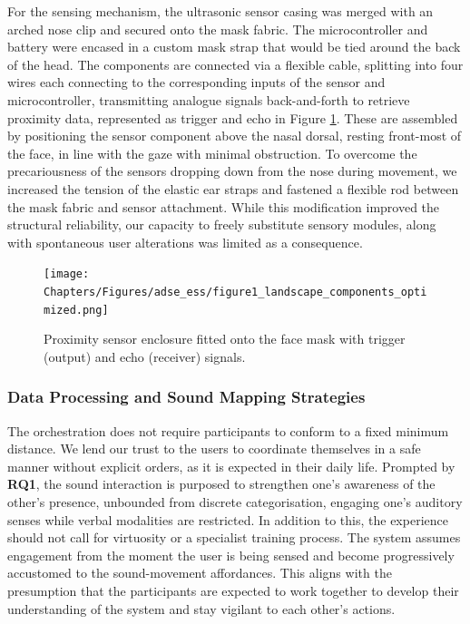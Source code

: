 For the sensing mechanism, the ultrasonic sensor casing was merged with an arched nose clip and secured onto the mask fabric. The microcontroller and battery were encased in a custom mask strap that would be tied around the back of the head. The components are connected via a flexible cable, splitting into four wires each connecting to the corresponding inputs of the sensor and microcontroller, transmitting analogue signals back-and-forth to retrieve proximity data, represented as trigger and echo in Figure \ref{fig:sensor_model}. These are assembled by positioning the sensor component above the nasal dorsal, resting front-most of the face, in line with the gaze with minimal obstruction. To overcome the precariousness of the sensors dropping down from the nose during movement, we increased the tension of the elastic ear straps and fastened a flexible rod between the mask fabric and sensor attachment. While this modification improved the structural reliability, our capacity to freely substitute sensory modules, along with spontaneous user alterations was limited as a consequence.

\begin{figure}[!h]
\captionsetup{width=1.0\textwidth}
\centering
\texttt{[image: Chapters/Figures/adse\_ess/figure1\_landscape\_components\_optimized.png]}
{\caption[Proximity sensor enclosure fitted onto the face mask.]{Proximity sensor enclosure fitted onto the face mask with trigger (output) and echo (receiver) signals.
}\label{fig:sensor_model}}
\vspace*{-20pt}
\end{figure}

\subsubsection{Data Processing and Sound Mapping Strategies}
\label{sec:mapping}

The orchestration does not require participants to conform to a fixed minimum distance. We lend our trust to the users to coordinate themselves in a safe manner without explicit orders, as it is expected in their daily life. Prompted by \textbf{RQ1}, the sound interaction is purposed to strengthen one’s awareness of the other’s presence, unbounded from discrete categorisation, engaging one’s auditory senses while verbal modalities are restricted. In addition to this, the experience should not call for virtuosity or a specialist training process. The system assumes engagement from the moment the user is being sensed and become progressively accustomed to the sound-movement affordances. This aligns with the presumption that the participants are expected to work together to develop their understanding of the system and stay vigilant to each other's actions.

